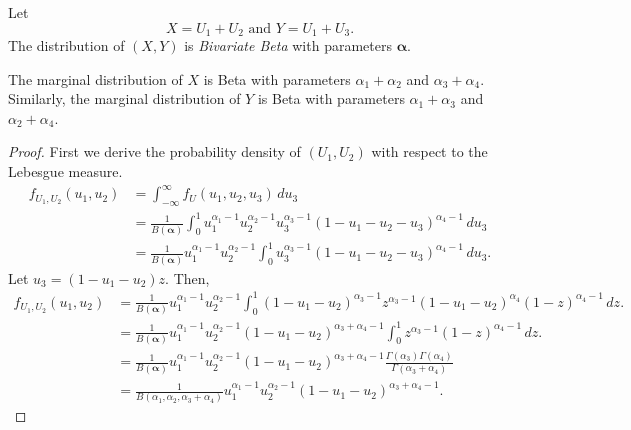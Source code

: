 \begin{definition}
  Let 
  \begin{equation}
    X = U_1 + U_2 \text{ and } Y = U_1 + U_3.
  \end{equation} 
    The distribution of $(X,Y)$ is {\em Bivariate Beta} with parameters
    $\boldsymbol{\alpha}$. 
\end{definition}

\begin{proposition}
  The marginal distribution of $X$ is Beta with parameters $\alpha_1 +
  \alpha_2$ and $\alpha_3 + \alpha_4$. Similarly, the marginal distribution of
  $Y$ is Beta with parameters $\alpha_1 + \alpha_3$ and $\alpha_2 + \alpha_4$.
\end{proposition}

\begin{proof}
  First we derive the probability density of $(U_1, U_2)$ with respect to the
  Lebesgue measure. 
  \begin{equation}
    \label{eq:dist-u1-u2}
    \begin{split}
      f_{U_1, U_2}(u_1, u_2) &= \int_{-\infty}^{\infty} f_{U}(u_1,u_2,u_3) \, du_3 \\ 
      &= \frac{1}{B(\boldsymbol{\alpha})}\int_0^1 u_1^{\alpha_1-1}u_2^{\alpha_2-1}u_3^{\alpha_3-1}(1-u_1-u_2-u_3)^{\alpha_4-1} \, du_3 \\
      &= \frac{1}{B(\boldsymbol{\alpha})}u_1^{\alpha_1-1}u_2^{\alpha_2-1}\int_0^1 u_3^{\alpha_3-1}(1-u_1-u_2-u_3)^{\alpha_4-1} \, du_3.
    \end{split}
  \end{equation}
  Let $u_3 = (1 - u_1 - u_2)z$. Then,
  \begin{equation}
    \begin{split}
      f_{U_1, U_2}(u_1, u_2) &= \frac{1}{B(\boldsymbol{\alpha})}u_1^{\alpha_1-1}u_2^{\alpha_2-1}\int_0^1 (1-u_1-u_2)^{\alpha_3-1}z^{\alpha_3-1}(1-u_1-u_2)^{\alpha_4}(1-z)^{\alpha_4-1} \, dz. \\
      &= \frac{1}{B(\boldsymbol{\alpha})}u_1^{\alpha_1-1}u_2^{\alpha_2-1}(1-u_1-u_2)^{\alpha_3+\alpha_4-1}\int_0^1 z^{\alpha_3-1}(1-z)^{\alpha_4-1} \, dz. \\
      &= \frac{1}{B(\boldsymbol{\alpha})}u_1^{\alpha_1-1}u_2^{\alpha_2-1}(1-u_1-u_2)^{\alpha_3+\alpha_4-1}\frac{\Gamma(\alpha_3)\Gamma(\alpha_4)}{\Gamma(\alpha_3 + \alpha_4)} \\
      &= \frac{1}{B(\alpha_1, \alpha_2, \alpha_3+\alpha_4)}u_1^{\alpha_1-1}u_2^{\alpha_2-1}(1-u_1-u_2)^{\alpha_3+\alpha_4-1}.
    \end{split}
  \end{equation}


\end{proof}
